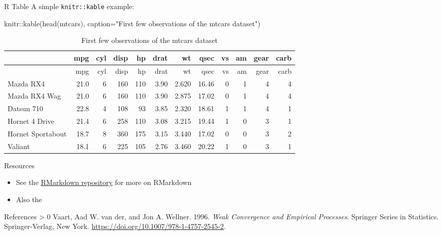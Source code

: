 \documentclass[10pt,ignorenonframetext,aspectratio=169]{beamer}
\newenvironment{Shaded}{\begin{snugshade}}{\end{snugshade}}
\newcommand{\AttributeTok}[1]{\textcolor[rgb]{0.77,0.63,0.00}{#1}}
\newcommand{\FunctionTok}[1]{\textcolor[rgb]{0.00,0.00,0.00}{#1}}
\newcommand{\NormalTok}[1]{#1}
\newcommand{\SpecialCharTok}[1]{\textcolor[rgb]{0.00,0.00,0.00}{#1}}
\newcommand{\StringTok}[1]{\textcolor[rgb]{0.31,0.60,0.02}{#1}}
\newlength{\cslhangindent}
\newenvironment{CSLReferences}[3] %
 {%
  \setlength{\parindent}{0pt}
  \ifodd #1 \everypar{\setlength{\hangindent}{\cslhangindent}}\ignorespaces\fi
  \ifnum #2 > 0
  \setlength{\parskip}{#2\baselineskip}
  \fi
 }%
 {}
\providecommand{\tightlist}{%
  \setlength{\itemsep}{0pt}\setlength{\parskip}{0pt}}
\renewenvironment{Shaded}{\color{black}\begin{snugshade}\color{black}}{\end{snugshade}}
\begin{document}
\begin{frame}[fragile]{R Table}
\protect\hypertarget{r-table}{}
A simple \texttt{knitr::kable} example:

\small

\begin{Shaded}
\begin{Highlighting}[]
\NormalTok{knitr}\SpecialCharTok{::}\FunctionTok{kable}\NormalTok{(}\FunctionTok{head}\NormalTok{(mtcars),}
       \AttributeTok{caption=}\StringTok{"First few observations of the mtcars dataset"}\NormalTok{)}
\end{Highlighting}
\end{Shaded}

\begin{longtable}[]{@{}lrrrrrrrrrrr@{}}
\caption{First few observations of the mtcars dataset}\tabularnewline
\toprule
& mpg & cyl & disp & hp & drat & wt & qsec & vs & am & gear & carb \\
\midrule
\endfirsthead
\toprule
& mpg & cyl & disp & hp & drat & wt & qsec & vs & am & gear & carb \\
\midrule
\endhead
Mazda RX4 & 21.0 & 6 & 160 & 110 & 3.90 & 2.620 & 16.46 & 0 & 1 & 4 &
4 \\
Mazda RX4 Wag & 21.0 & 6 & 160 & 110 & 3.90 & 2.875 & 17.02 & 0 & 1 & 4
& 4 \\
Datsun 710 & 22.8 & 4 & 108 & 93 & 3.85 & 2.320 & 18.61 & 1 & 1 & 4 &
1 \\
Hornet 4 Drive & 21.4 & 6 & 258 & 110 & 3.08 & 3.215 & 19.44 & 1 & 0 & 3
& 1 \\
Hornet Sportabout & 18.7 & 8 & 360 & 175 & 3.15 & 3.440 & 17.02 & 0 & 0
& 3 & 2 \\
Valiant & 18.1 & 6 & 225 & 105 & 2.76 & 3.460 & 20.22 & 1 & 0 & 3 & 1 \\
\bottomrule
\end{longtable}
\end{frame}

\begin{frame}{Resources}
\protect\hypertarget{resources}{}
\begin{itemize}[<+->]
\tightlist
\item
  See the \href{https://github.com/rstudio/rmarkdown}{RMarkdown
  repository} for more on RMarkdown
\item
  Also the
\end{itemize}
\end{frame}

\begin{frame}{References}
\protect\hypertarget{references}{}
\hypertarget{refs}{}
\begin{CSLReferences}{1}{0}
\leavevmode\hypertarget{ref-vanderVaart.Wellner:96}{}%
Vaart, Aad W. van der, and Jon A. Wellner. 1996. \emph{Weak Convergence
and Empirical Processes}. Springer Series in Statistics.
Springer-Verlag, New York.
\url{https://doi.org/10.1007/978-1-4757-2545-2}.

\end{CSLReferences}
\end{frame}
\end{document}
